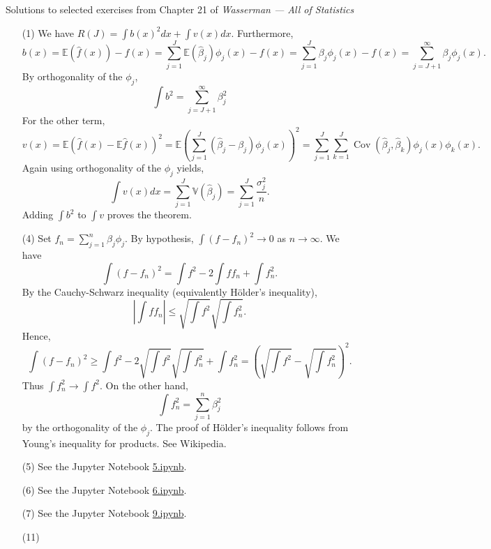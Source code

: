 \documentclass[10pt]{article}
\newcommand{\V}{\mathbb{V}}
\newcommand{\E}{\mathbb{E}}
\newcommand{\Cov}{\operatorname{Cov}}
\begin{document}
\noindent \large{Solutions to selected exercises from Chapter 21 of
\emph{Wasserman --- All of Statistics}}

\begin{enumerate}

\item[(1)]
We have $R(J) = \int b(x)^2dx + \int v(x)dx$. Furthermore,
\[
b(x) = \E(\hat f(x)) - f(x) = \sum_{j=1}^J \E(\hat \beta_j) \phi_j(x) - f(x)
= \sum_{j=1}^J \beta_j \phi_j(x) - f(x) = \sum_{j=J+1}^\infty \beta_j \phi_j(x).
\]
By orthogonality of the $\phi_j$,
\[
\int b^2 = \sum_{j=J+1}^\infty \beta_j^2
\]
For the other term,
\[
v(x) = \E\left(\hat f(x) - \E \hat f(x)\right)^2 =
\E \left( \sum_{j=1}^J (\hat \beta_j - \beta_j)\phi_j(x)\right)^2
= \sum_{j=1}^J \sum_{k=1}^J \Cov(\hat \beta_j, \hat \beta_k) \phi_j(x) \phi_k(x).
\]
Again using orthogonality of the $\phi_j$ yields,
\[
\int v(x) dx = \sum_{j=1}^J \V(\hat \beta_j) = \sum_{j=1}^J \frac{\sigma_j^2}{n}.
\]
Adding $\int b^2$ to $\int v$ proves the theorem.

\item[(4)]
Set $f_n = \sum_{j=1}^n \beta_j \phi_j$. By hypothesis,
$\int (f-f_n)^2\to 0$ as $n\to \infty$. We have
\[
    \int(f - f_n)^2 = \int f^2 - 2\int f f_n + \int f_n^2.
\]
By the Cauchy-Schwarz inequality (equivalently H\"{o}lder's inequality),
\[
\left|\int f f_n\right| \leq \sqrt{\int f^2} \sqrt{\int f_n^2}.
\]
Hence,
\[
    \int (f - f_n)^2 \geq \int f^2 - 2 \sqrt{\int f^2} \sqrt{\int f_n^2} +
    \int f_n^2 = \left(\sqrt{\int f^2} - \sqrt{\int f_n^2}\right)^2.
\]
Thus $\int f_n^2 \to \int f^2$. On the other hand,
\[
    \int f_n^2 = \sum_{j=1}^n \beta_j^2
\]
by the orthogonality of the $\phi_j$. The proof of H\"{o}lder's inequality
follows from Young's inequality for products. See Wikipedia.

\item[(5)]
See the Jupyter Notebook
\href{https://github.com/ajrasmus/some_of_statistics/blob/main/chapter_21/5.ipynb}{5.ipynb}.

\item[(6)]
See the Jupyter Notebook
\href{https://github.com/ajrasmus/some_of_statistics/blob/main/chapter_21/6.ipynb}{6.ipynb}.

\item[(7)]
See the Jupyter Notebook
\href{https://github.com/ajrasmus/some_of_statistics/blob/main/chapter_21/9.ipynb}{9.ipynb}.

\item[(11)]

\end{enumerate}
\end{document}
